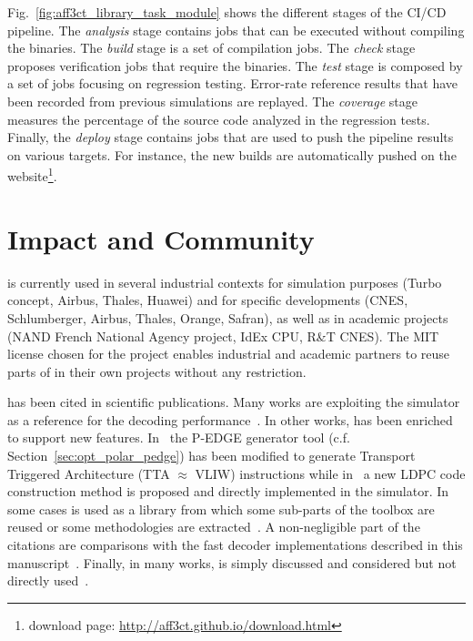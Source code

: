 Fig.~\ref{fig:aff3ct_library_task_module} shows the different stages of the
\AFFECT CI/CD pipeline. The \emph{analysis} stage contains jobs that can be
executed without compiling the \AFFECT binaries. The \emph{build} stage is a set
of compilation jobs. The \emph{check} stage proposes verification jobs that
require the \AFFECT binaries. The \emph{test} stage is composed by a set of jobs
focusing on regression testing. Error-rate reference results that have been
recorded from previous simulations are replayed. The \emph{coverage} stage
measures the percentage of the \AFFECT source code analyzed in the regression
tests. Finally, the \emph{deploy} stage contains jobs that are used to push the
pipeline results on various targets. For instance, the new builds are
automatically pushed on the \AFFECT website\footnote{\AFFECT download page:
\url{http://aff3ct.github.io/download.html}}.

\section{Impact and Community}
\label{sec:aff3ct_impact}

\AFFECT is currently used in several industrial contexts for simulation purposes
(Turbo concept, Airbus, Thales, Huawei) and for specific developments (CNES,
Schlumberger, Airbus, Thales, Orange, Safran), as well as in academic projects
(NAND French National Agency project, IdEx CPU, R\&T CNES). The MIT license
chosen for the project enables industrial and academic partners to reuse parts
of \AFFECT in their own projects without any restriction.

\AFFECT has been cited in scientific publications. Many works are exploiting the
\AFFECT simulator as a reference for the decoding performance~\cite{Pignoly2018,
Poulenard2018,Ghanaatian2018,Wang2019,Hsieh2020,Rush2020,Duffy2020}. In other
works, \AFFECT has been enriched to support new features.
In~\cite{Leonardon2018b} the P-EDGE generator tool (c.f.
Section~\ref{sec:opt_polar_pedge}) has been modified to generate Transport
Triggered Architecture (TTA $\approx$ VLIW) instructions while
in~\cite{Tasdighi2020} a new LDPC code construction method is proposed and
directly implemented in the \AFFECT simulator. In some cases \AFFECT is used as
a library from which some sub-parts of the toolbox are reused or some
methodologies are extracted~\cite{Florian2018,Cavatassi2019a,Cavatassi2019b,
Ercan2020}. A non-negligible part of the citations are comparisons with the fast
decoder implementations described in this manuscript~\cite{Zeng2017,
Leonardon2018a,Guermouche2019,LeGal2019a,Shen2020}. Finally, in many works,
\AFFECT is simply discussed and considered but not directly
used~\cite{Debbabi2016,Debbabi2016a,Ercan2017,Natarajan2018,Cenova2019,
Krainyk2019,Vameghestahbanati2019,Mohammed2019,Shaheen2019,Aly2019,
Delomier2020}.

